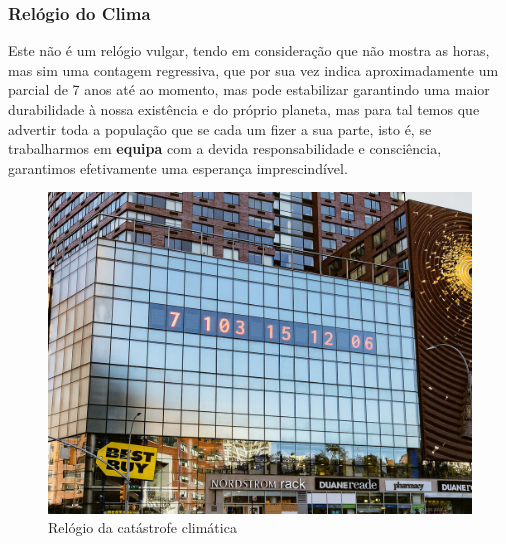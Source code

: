 \documentclass[letterpaper,12pt]{article}
\begin{document}
\subsubsection{Relógio do Clima}
\par \citep{dures_2020_um}Este não é um relógio vulgar, tendo em consideração que não mostra as horas, mas sim uma contagem regressiva, que por sua vez indica aproximadamente um parcial de 7 anos até ao momento, mas pode estabilizar garantindo uma maior durabilidade à nossa existência e do próprio planeta, mas para tal temos que advertir toda a população que se cada um fizer a sua parte, isto é, se trabalharmos em {\bf equipa} com a devida responsabilidade e consciência, garantimos efetivamente uma esperança imprescindível. 
\begin{figure}[!htb]
    \centering
    \includegraphics[scale = 3]{Relogio.jpg}
    \caption{Relógio da catástrofe climática}
    \label{fig:Relógio}
\end{figure}
\end{document}
